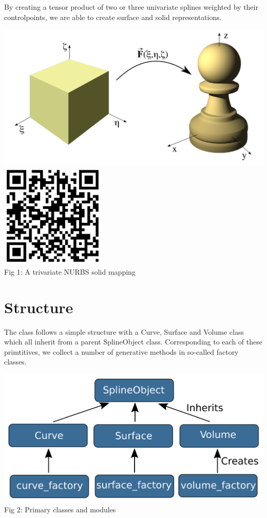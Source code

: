 \documentclass[landscape]{sintefposter}
\begin{document}
\begin{multicols}{3}
By creating a tensor product of two or three univariate splines weighted by their controlpoints, we are able to create surface and solid representations.

\begin{center}
  \includegraphics[width=16cm]{pawn-mapping}
  \includegraphics[height=5cm]{MappingQR} \\
  \normalsize{Fig 1: A trivariate NURBS solid mapping}
\end{center}

\vspace{-1cm}
\section{Structure}

The class follows a simple structure with a Curve, Surface and Volume class which all inherit from a parent SplineObject class. Corresponding to each of these primtitives, we collect a number of generative methods in so-called factory classes.

\begin{center}
  \includegraphics[width=0.7\linewidth]{classstructure} \\
  \normalsize{Fig 2: Primary classes and modules}
\end{center}


\end{multicols}
\end{document}
